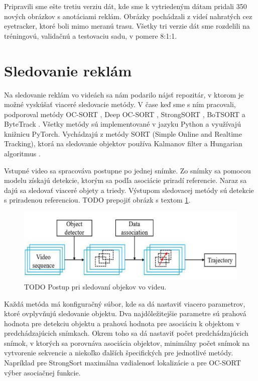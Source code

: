 Pripravili sme ešte tretiu verziu dát, kde sme k vytriedeným dátam pridali 350 nových obrázkov s anotáciami reklám. Obrázky pochádzali z videí nahratých cez eyetracker, ktoré boli mimo meranú trasu. Všetky tri verzie dát sme rozdelili na tréningovú, validačnú a testovaciu sadu, v pomere 8:1:1.

\section{Sledovanie reklám}

Na sledovanie reklám vo videách sa nám podarilo nájsť repozitár, v ktorom je možné vyskúšať viaceré sledovacie metódy. V čase keď sme s ním pracovali, podporoval metódy OC-SORT \cite{ocsort}, Deep OC-SORT \cite{TODO}, StrongSORT \cite{strongsort}, BoTSORT \cite{TODO} a ByteTrack \cite{bytetrack}. Všetky metódy sú implementované v jazyku Python a využívajú knižnicu PyTorch. Vychádzajú z metódy SORT (Simple Online and Realtime Tracking), ktorá na sledovanie objektov používa Kalmanov filter a Hungarian algoritmus \cite{sort}.

Vstupné video sa spracováva postupne po jednej snímke. Zo snímky sa pomocou modelu získajú detekcie, ktorým sa podľa asociácie priradí referencie. Naraz sa dajú sa sledovať viaceré objety a triedy. Výstupom sledovacej metódy sú detekcie s priradenou referenciou. TODO prepojiť obrázk s textom \ref{img:tracking}.

 \begin{figure}[ht]
     \centering
     \includegraphics[width=1\textwidth]{images/04/flow.png}
     \caption{TODO Postup pri sledovaní objekov vo videu.}
     \label{img:tracking}
 \end{figure}

Každá metóda má konfiguračný súbor, kde sa dá nastaviť viacero parametrov, ktoré ovplyvňujú sledovanie objektu. Dva najdôležitejšie parametre sú prahová hodnota pre detekciu objektu a prahová hodnota pre asociáciu k objektom v predchádzajúcich snímkach. Okrem toho sa dá nastaviť počet predchádzajúcich snímok, v ktorých sa porovnáva asociácia objektov, minimálny počet snímok na vytvorenie sekvencie a niekoľko ďalších špecifických pre jednotlivé metódy. Napríklad pre StrongSort maximálna vzdialenosť lokalizácie a pre OC-SORT výber asociačnej funkcie.

